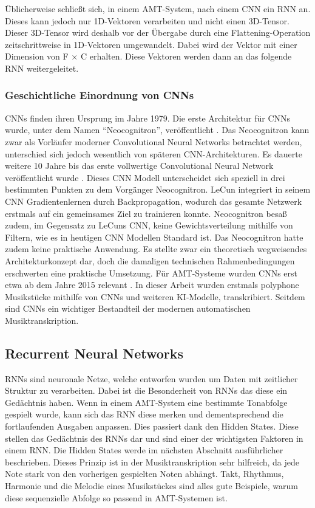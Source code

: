 Üblicherweise schließt sich, in einem AMT-System, nach einem CNN ein RNN an.
Dieses kann jedoch nur 1D-Vektoren verarbeiten und nicht einen 3D-Tensor.
Dieser 3D-Tensor wird deshalb vor der Übergabe durch eine Flattening-Operation
zeitschrittweise in 1D-Vektoren umgewandelt.
Dabei wird der Vektor mit einer Dimension von F × C erhalten.
Diese Vektoren werden dann an das folgende RNN weitergeleitet.

\subsubsection{Geschichtliche Einordnung von CNNs}
CNNs finden ihren Ursprung im Jahre 1979.
Die erste Architektur für CNNs wurde, unter dem Namen \enquote{Neocognitron}, veröffentlicht \cite{fukushima1980neocognitron}.
Das Neocognitron kann zwar als Vorläufer moderner Convolutional Neural Networks betrachtet werden,
unterschied sich jedoch wesentlich von späteren CNN-Architekturen.
Es dauerte weitere 10 Jahre bis das erste vollwertige Convolutional Neural Network veröffentlicht wurde \cite{lecun1989backpropagation}.
Dieses CNN Modell unterscheidet sich speziell in drei bestimmten Punkten zu dem Vorgänger Neocognitron.
LeCun integriert in seinem CNN Gradientenlernen durch Backpropagation,
wodurch das gesamte Netzwerk erstmals auf ein gemeinsames Ziel zu trainieren konnte.
Neocognitron besaß zudem, im Gegensatz zu LeCuns CNN,
keine Gewichtsverteilung mithilfe von Filtern, wie es in heutigen CNN Modellen Standard ist.
Das Neocognitron hatte zudem keine praktische Anwendung.
Es stellte zwar ein theoretisch wegweisendes Architekturkonzept dar,
doch die damaligen technischen Rahmenbedingungen erschwerten eine praktische Umsetzung.
Für AMT-Systeme wurden CNNs erst etwa ab dem Jahre 2015 relevant \cite{sigtia2016end}.
In dieser Arbeit wurden erstmals polyphone Musikstücke mithilfe von CNNs und weiteren KI-Modelle, transkribiert.
Seitdem sind CNNs ein wichtiger Bestandteil der modernen automatischen Musiktranskription.

\subsection{Recurrent Neural Networks}
RNNs sind neuronale Netze, welche entworfen wurden um Daten mit zeitlicher Struktur zu verarbeiten.
Dabei ist die Besonderheit von RNNs das diese ein Gedächtnis haben.
Wenn in einem AMT-System eine bestimmte Tonabfolge gespielt wurde,
kann sich das RNN diese merken und dementsprechend die fortlaufenden Ausgaben anpassen.
Dies passiert dank den Hidden States.
Diese stellen das Gedächtnis des RNNs dar und sind einer der wichtigsten Faktoren in einem RNN\@.
Die Hidden States werde im nächsten Abschnitt ausführlicher beschrieben.
Dieses Prinzip ist in der Musiktranskription sehr hilfreich,
da jede Note stark von den vorherigen gespielten Noten abhängt.
Takt, Rhythmus, Harmonie und die Melodie eines Musikstückes sind alles gute Beispiele,
warum diese sequenzielle Abfolge so passend in AMT-Systemen ist.

